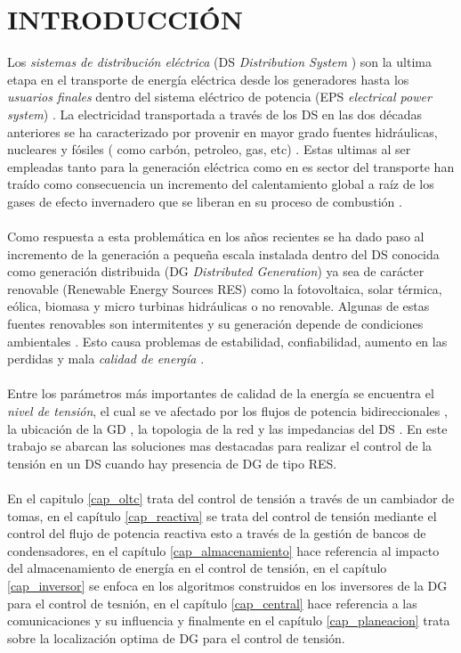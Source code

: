 \documentclass[12pt, letterpaper]{report}
\begin{document}
\sloppy
\chapter*{INTRODUCCIÓN}
Los \textit{sistemas de distribución eléctrica} (DS \textit{Distribution System} ) son la ultima etapa en el transporte de energía eléctrica  desde los generadores hasta los \textit{usuarios finales} dentro del sistema eléctrico de potencia (EPS  \textit{electrical power system}) \cite{basso2004ieee}. La electricidad transportada a través de los DS en las dos décadas anteriores se ha caracterizado por provenir en mayor grado fuentes hidráulicas, nucleares y  fósiles ( como carbón, petroleo, gas, etc) \cite{Bacha2015}. Estas ultimas al ser empleadas tanto para la generación eléctrica como en es sector del transporte \cite{Bahmanifirouzi2012} han traído como consecuencia un incremento del calentamiento global a raíz  de los gases de efecto invernadero que se liberan en  su proceso de combustión  \cite{Hauck2017}.\\\\
Como respuesta a esta problemática en los años recientes se ha dado  paso al incremento de la generación a pequeña  escala instalada dentro del DS conocida como generación distribuida  (DG \textit{Distributed Generation}) ya sea de carácter renovable  (Renewable Energy Sources RES) como la fotovoltaica, solar térmica, eólica, biomasa y micro turbinas hidráulicas  \cite{Calderaro2014} o no renovable. Algunas de estas fuentes renovables son intermitentes y su generación depende de condiciones ambientales \cite{Mahmud2016}. Esto causa problemas de estabilidad, confiabilidad, aumento en las perdidas y mala \textit{calidad de energía} \cite{Karanki2014}\cite{DinakaraPrasadReddy2017}.\\\\ 
Entre los parámetros más importantes de  calidad de la energía se encuentra el \textit{nivel de tensión}, el cual se ve afectado por los flujos de potencia bidireccionales \cite{Koutsoukis2017}, la ubicación de la GD \cite{Othman2016a}, la topologia de la red y las impedancias del DS .  En este trabajo se abarcan las soluciones mas destacadas  para realizar el control de la tensión en un DS cuando hay presencia de DG de tipo RES. \\\\
En el capitulo \ref{cap_oltc} trata del control de tensión a través de un cambiador de tomas, en el capítulo \ref{cap_reactiva} se trata del control de tensión mediante el control del flujo de potencia reactiva esto  a través de la gestión de bancos de condensadores, en el capítulo \ref{cap_almacenamiento} hace referencia al impacto del almacenamiento de energía en el control de tensión, en el capítulo \ref{cap_inversor} se enfoca en los algoritmos construidos  en los inversores  de la DG para el control de tesnión, en el capítulo \ref{cap_central} hace referencia  a las comunicaciones y su influencia  y finalmente en el capítulo \ref{cap_planeacion} trata sobre la localización optima de DG para el control de tensión.\\\\
\end{document}
